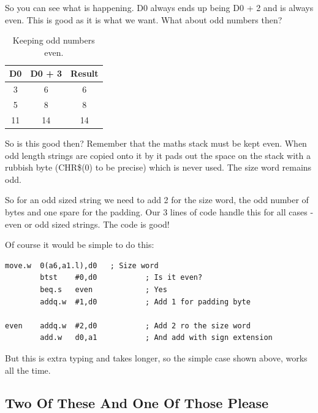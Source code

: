 So you can see what is happening. D0 always ends up being D0 + 2
      and is always even. This is good as it is what we want. What about odd
      numbers then?

\begin{table}[htbp]
\centering
\begin{tabular}{c c c}  %
\toprule
\textbf{D0} & \textbf{D0 + 3} & \textbf{Result} \\
\midrule
%
3 & 6 & 6\\
5 & 8 & 8\\
11 & 14 & 14\\
%
\bottomrule
\end{tabular}
\caption{Keeping odd numbers even.}
\label{tab:KeepingOddNumbersEven}
\end{table}


So is this good then? Remember that the maths stack must be kept
      even. When odd length strings are copied onto it by  it pads out
      the space on the stack with a rubbish byte (CHR\$(0) to be precise) which
      is never used. The size word remains odd.

So for an odd sized string we need to add 2 for the size word, the
      odd number of bytes and one spare for the padding. Our 3 lines of code
      handle this for all cases -{} even or odd sized strings. The code is good!

Of course it would be simple to do this:

\begin{lstlisting}[firstnumber=1,caption={Long Way to Keep Things Even},label={lst:LonegWayToKeepThingsEven}]
        move.w  0(a6,a1.l),d0   ; Size word
        btst    #0,d0           ; Is it even?
        beq.s   even            ; Yes
        addq.w  #1,d0           ; Add 1 for padding byte

even    addq.w  #2,d0           ; Add 2 ro the size word
        add.w   d0,a1           ; And add with sign extension
\end{lstlisting}

But this is extra typing and takes longer, so the simple case
      shown above, works all the time.

\subsection{Two Of These And One Of Those Please}
\label{ch7-mixed-parameters}%

